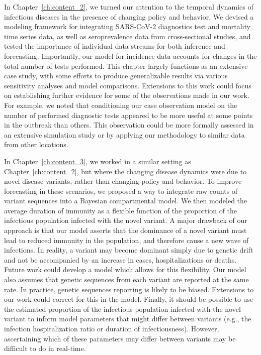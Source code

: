In Chapter~\ref{ch:content_2}, we turned our attention to the temporal dynamics of infectious diseases in the presence of changing policy and behavior.
We devised a modeling framework for integrating SARS-CoV-2 diagnostics test and mortality time series data, as well as seroprevalence data from cross-sectional studies, and tested the importance of individual data streams for both inference and forecasting.
Importantly, our model for incidence data accounts for changes in the total number of tests performed.
This chapter largely functions as an extensive case study, with some efforts to produce generalizable results via various sensitivity analyses and model comparisons.
Extensions to this work could focus on establishing further evidence for some of the observations made in our work.
For example, we noted that conditioning our case observation model on the number of performed diagnostic tests appeared to be more useful at some points in the outbreak than others.
This observation could be more formally assessed in an extensive simulation study or by applying our methodology to similar data from other locations.

In Chapter~\ref{ch:content_3}, we worked in a similar setting as Chapter~\ref{ch:content_2}, but where the changing disease dynamics were due to novel disease variants, rather than changing policy and behavior.
To improve forecasting in these scenarios, we proposed a way to integrate raw counts of variant sequences into a Bayesian compartmental model.
We then modeled the average duration of immunity as a flexible function of the proportion of the infectious population infected with the novel variant.
A major drawback of our approach is that our model asserts that the dominance of a novel variant must lead to reduced immunity in the population, and therefore cause a new wave of infections.
In reality, a variant may become dominant simply due to genetic drift and not be accompanied by an increase in cases, hospitalizations or deaths.
Future work could develop a model which allows for this flexibility.
Our model also assumes that genetic sequences from each variant are reported at the same rate.
In practice, genetic sequences reporting is likely to be biased.
Extensions to our work could correct for this in the model.
Finally, it should be possible to use the estimated proportion of the infectious population infected with the novel variant to inform model parameters that might differ between variants (e.g., the infection hospitalization ratio or duration of infectiousness).
However, ascertaining which of these parameters may differ between variants may be difficult to do in real-time.

